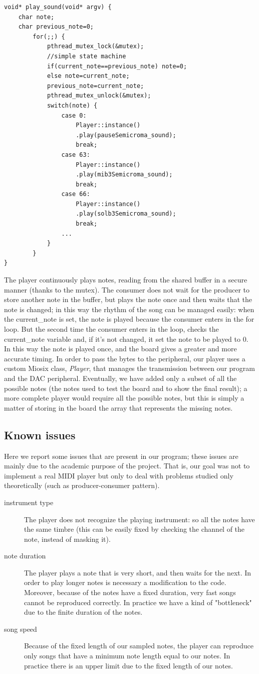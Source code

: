 \documentclass[12pt]{article}
\begin{document}
\begin{lstlisting}
void* play_sound(void* argv) {
	char note;
	char previous_note=0;
		for(;;) {
			pthread_mutex_lock(&mutex);
			//simple state machine
			if(current_note==previous_note) note=0;
			else note=current_note;
			previous_note=current_note;
			pthread_mutex_unlock(&mutex);
			switch(note) {
				case 0:
					Player::instance()
					.play(pauseSemicroma_sound);
					break;
				case 63:
					Player::instance()
					.play(mib3Semicroma_sound);
					break;
				case 66:
					Player::instance()
					.play(solb3Semicroma_sound);
					break;
				...
			}
		}
}
\end{lstlisting}
The player continuously plays notes, reading from the shared buffer in a secure manner (thanks to the mutex). The consumer does not wait for the producer to store another note in the buffer, but plays the note once and then waits that the note is changed; in this way the rhythm of the song can be managed easily: when the current\_note is set, the note is played because the consumer enters in the for loop. But the second time the consumer enters in the loop, checks the current\_note variable and, if it's not changed, it set the note to be played to 0. In this way the note is played once, and the board gives a greater and more accurate timing.\newline
In order to pass the bytes to the peripheral, our player uses a custom Miosix class, \textit{Player}, that manages the transmission between our program and the DAC peripheral. Eventually, we have added only a subset of all the possible notes (the notes used to test the board and to show the final result); a more complete player would require all the possible notes, but this is simply a matter of storing in the board the array that represents the missing notes.
\subsection{Known issues}
Here we report some issues that are present in our program; these issues are mainly due to the academic purpose of the project. That is, our goal was not to implement a real MIDI player but only to deal with problems studied only theoretically (such as producer-consumer pattern).
\begin{description}
	\item[instrument type] The player does not recognize the playing instrument: so all the notes have the same timbre (this can be easily fixed by checking the channel of the note, instead of masking it).
	\item[note duration] The player plays a note that is very short, and then waits for the next. In order to play longer notes is necessary a modification to the code. Moreover, because of the notes have a fixed duration, very fast songs cannot be reproduced correctly. In practice we have a kind of "bottleneck" due to the finite duration of the notes.
	\item[song speed] Because of the fixed length of our sampled notes, the player can reproduce only songs that have a minimum note length equal to our notes. In practice there is an upper limit due to the fixed length of our notes.
\end{description}
\end{document}

